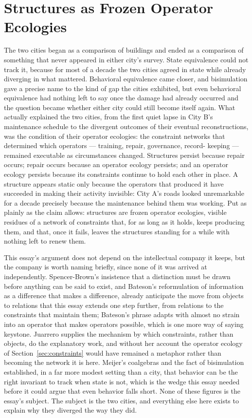 \documentclass[11pt]{article}
\begin{document}
\section{Structures as Frozen Operator Ecologies}\label{sec:conclusion}

The two cities began as a comparison of buildings and ended as a
comparison of something that never appeared in either city's survey.
State equivalence could not track it, because for most of a decade
the two cities agreed in state while already diverging in what
mattered. Behavioral equivalence came closer, and bisimulation gave a
precise name to the kind of gap the cities exhibited, but even
behavioral equivalence had nothing left to say once the damage had
already occurred and the question became whether either city could
still become itself again. What actually explained the two cities,
from the first quiet lapse in City B's maintenance schedule to the
divergent outcomes of their eventual reconstructions, was the
condition of their operator ecologies: the constraint networks that
determined which operators --- training, repair, governance, record-
keeping --- remained executable as circumstances changed. Structures
persist because repair occurs; repair occurs because an operator
ecology persists; and an operator ecology persists because its
constraints continue to hold each other in place. A structure appears
static only because the operators that produced it have succeeded in
making their activity invisible: City A's roads looked unremarkable
for a decade precisely because the maintenance behind them was
working. Put as plainly as the claim allows: structures are frozen
operator ecologies, visible residues of a network of constraints
that, for as long as it holds, keeps producing them, and that, once
it fails, leaves the structures standing for a while with nothing
left to renew them.

This essay's argument does not depend on the intellectual company it
keeps, but the company is worth naming briefly, since none of it was
arrived at independently. Spencer-Brown's insistence that a distinction
must be drawn before anything can be said to exist, and Bateson's
reformulation of information as a difference that makes a difference,
already anticipate the move from objects to relations that this essay
extends one step further, from relations to the constraints that
maintain them; Bateson's phrase adapts with almost no strain into an
operator that makes operators possible, which is one more way of
saying keystone. Juarrero supplies the mechanism by which constraints,
rather than objects, do the explanatory work, and without her account
the operator ecology of Section~\ref{sec:constraints} would have
remained a metaphor rather than becoming the network it is here.
Meijer's coalgebras and the fact of bisimulation established, in a far
more modest setting than a city, that behavior can be the right
invariant to track when state is not, which is the wedge this essay
needed before it could argue that even behavior falls short. None of
these figures is the essay's subject. The subject is the two cities,
and everything else here exists to explain why they diverged the way
they did.
\end{document}
